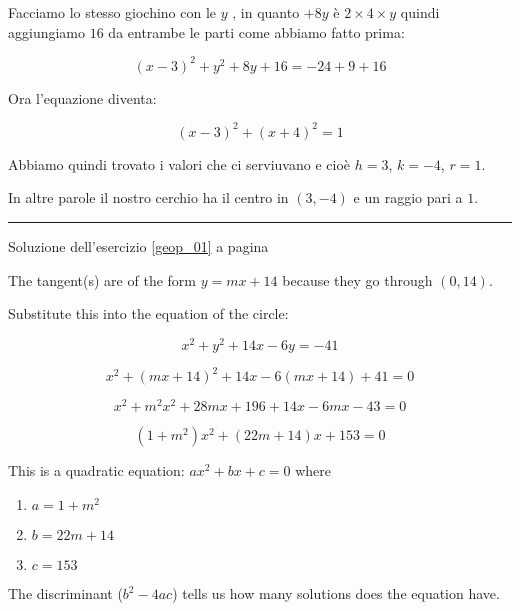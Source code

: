 Facciamo lo stesso giochino con le $y$ , in quanto $+8y$ è $2\times 4 \times y$ quindi aggiungiamo $16$ da entrambe le parti come abbiamo fatto prima:

\begin{equation*}
(x-3)^2 
+y^2
+8y
+16
=-24 + 9 +16
\end{equation*}

Ora l'equazione diventa:

\begin{equation*}
(x-3)^2+ 
(x+4)^2
=1
\end{equation*}


Abbiamo quindi trovato i valori che ci serviuvano e cioè $h=3$, $k=-4$, $r=1$.

In altre parole il nostro cerchio ha il centro in $(3,-4)$ e un raggio pari a $1$.



\vspace{1cm}
\hrule
\vspace{1cm}


Soluzione dell'esercizio \ref{geop_01} a pagina \pageref{geop_01}\label{geos_01}

The tangent(s) are of the form $y = mx + 14$ because they go through $(0,14)$.

Substitute this into the equation of the circle:


\begin{equation*}
x^2+y^2+14x-6y=-41
\end{equation*}

\begin{equation*}
x^2+(mx+14)^2+14x-6(mx+14)+41=0
\end{equation*}


\begin{equation*}
x^2+m^2x^2+28mx+196+14x-6mx-43=0
\end{equation*}

\begin{equation*}
(1+m^2)x^2+(22m+14)x+153=0
\end{equation*}

This is a quadratic equation: $ax^2+bx+c=0$
where
\begin{enumerate}
\item $a=1+m^2$
\item $b=22m+14$
\item $c=153$
\end{enumerate}

The discriminant ($b^2-4ac$) tells us how many solutions does the equation have.

